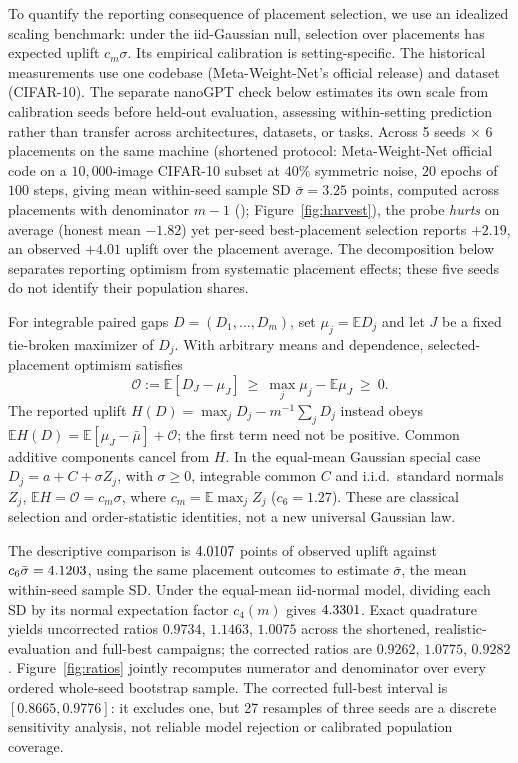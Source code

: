 To quantify the reporting consequence of placement selection, we use an
idealized scaling benchmark: under the iid-Gaussian null, selection over
placements has expected uplift $c_m\sigma$. Its empirical calibration is
setting-specific. The historical measurements use one codebase
(Meta-Weight-Net's official release) and dataset (CIFAR-10). The separate
nanoGPT check below estimates its own scale from calibration seeds before
held-out evaluation, assessing within-setting prediction rather than
transfer across architectures, datasets, or tasks.
Across 5 seeds $\times$ 6 placements on the same machine
(shortened protocol: Meta-Weight-Net official code on a $10{,}000$-image
CIFAR-10 subset at $40\%$ symmetric noise, $20$ epochs of $100$ steps, giving
mean within-seed sample SD $\bar\sigma = 3.25$ points, computed across
placements with denominator $m-1$ (); Figure~\ref{fig:harvest}),
the probe \emph{hurts} on
average (honest mean $-1.82$) yet per-seed best-placement selection
reports $+2.19$, an observed $+4.01$ uplift over the placement average.
The decomposition below separates reporting optimism from systematic
placement effects; these five seeds do not identify their population shares.

\begin{proposition}
\label{prop:harvest}
For integrable paired gaps $D=(D_1,\ldots,D_m)$, set $\mu_j=\mathbb E D_j$
and let $J$ be a fixed tie-broken maximizer of $D_j$. With arbitrary means
and dependence, selected-placement optimism satisfies
\[
\mathcal O:=\mathbb E[D_J-\mu_J]
\ \ge\ \max_j\mu_j-\mathbb E\mu_J\ \ge\ 0.
\]
The reported uplift $H(D)=\max_jD_j-m^{-1}\sum_jD_j$ instead obeys
$\mathbb EH(D)=\mathbb E[\mu_J-\bar\mu]+\mathcal O$; the first term need
not be positive. Common additive components cancel from $H$.
In the equal-mean Gaussian special case $D_j=a+C+\sigma Z_j$, with $\sigma\ge0$,
integrable common $C$ and i.i.d.\ standard normals $Z_j$,
$\mathbb EH=\mathcal O=c_m\sigma$, where $c_m=\mathbb E\max_j Z_j$
($c_6=1.27$). These are classical selection and order-statistic identities,
not a new universal Gaussian law.
\end{proposition}

\evidencefloats{}
The descriptive comparison is $4.0107$ points of observed uplift
against $c_6\bar\sigma=4.1203$, using the same placement outcomes
to estimate $\bar\sigma$, the mean within-seed sample SD. Under the
equal-mean iid-normal model, dividing each SD by its normal expectation
factor $c_4(m)$ gives $4.3301$. Exact quadrature yields
uncorrected ratios $0.9734$, $1.1463$, $1.0075$ across the shortened,
realistic-evaluation and full-best campaigns; the corrected ratios are
$0.9262$, $1.0775$, $0.9282$. Figure~\ref{fig:ratios} jointly recomputes
numerator and denominator over every ordered whole-seed bootstrap sample.
The corrected full-best interval is $[0.8665,0.9776]$: it excludes one, but
27 resamples of three seeds are a discrete sensitivity analysis, not reliable
model rejection or calibrated population coverage.

